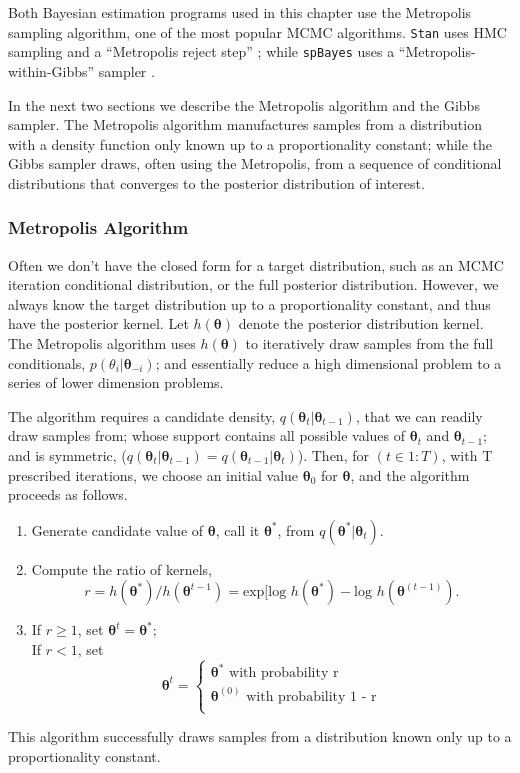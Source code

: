 Both Bayesian estimation programs used in this chapter use the Metropolis sampling algorithm, one of the most popular MCMC algorithms. \verb|Stan| uses HMC sampling and a ``Metropolis reject step'' \citep{STANtheMan}; while \verb|spBayes| uses a ``Metropolis-within-Gibbs'' sampler \citep{Finley2013}. 

In the next two sections we describe the Metropolis algorithm and the Gibbs sampler. The Metropolis algorithm manufactures samples from a distribution with a density function only known up to a proportionality constant; while the Gibbs sampler draws, often using the Metropolis, from a sequence of conditional distributions that converges to the posterior distribution of interest.

\subsubsection{Metropolis Algorithm } %

Often we don't have the closed form for a target distribution, such as an MCMC iteration conditional distribution, or the full posterior distribution. However, we always know the target distribution up to a proportionality constant, and thus have the posterior kernel. Let $h(\pmb{\theta})$ denote the posterior distribution kernel. The Metropolis algorithm uses $h(\pmb{\theta})$ to iteratively draw samples from the full conditionals, $p(\theta_{i}|\pmb{\theta}_{-i})$; and essentially reduce a high dimensional problem to a series of lower dimension problems. 

The algorithm requires a  candidate density, $q(\pmb{\theta}_{t}|\pmb{\theta}_{t-1})$, that we can readily draw samples from; whose support contains all possible values of $\pmb{\theta}_{t}$ and $\pmb{\theta}_{t-1}$; and is symmetric, ($q(\pmb{\theta}_{t}|\pmb{\theta}_{t-1}) = q(\pmb{\theta}_{t-1}|\pmb{\theta}_{t})$). Then, for $(t \in 1:T)$, with T prescribed iterations, we choose an initial value $\pmb{\theta}_{0}$ for $\pmb{\theta}$, and the algorithm proceeds as follows.
\begin{enumerate}
\item Generate candidate value of $\pmb{\theta}$, call it $\pmb{\theta}^{*}$, from $q(\pmb{\theta}^{*}|\pmb{\theta}_{t})$.
\item Compute the ratio of kernels,
$$ r=h(\pmb{\theta}^{*})/h(\pmb{\theta}^{t-1}) = \text{exp}[\text{log }h(\pmb{\theta}^{*}) - \text{log }h(\pmb{\theta}^{(t-1)}). $$
\item If $r \geq  1$, set $\pmb{\theta}^{t} = \pmb{\theta}^{*}$; \\
            If $r < 1$, set 
            \[ 
            \pmb{\theta}^{t} = 
            \begin{cases} 
            \pmb{\theta}^{*} \text{ with probability r} \\
            \pmb{\theta}^{(0)} \text{ with probability 1 - r} \\
            \end{cases}
            \]
  \end{enumerate}
This algorithm successfully draws samples from a distribution known only up to a proportionality constant.   

